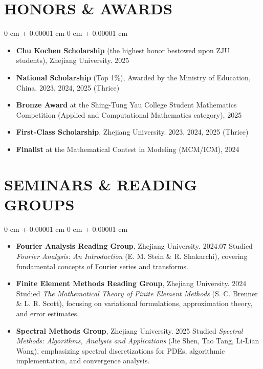 \documentclass[10pt, letterpaper]{article}
\newenvironment{highlights}{
    \begin{itemize}[
        topsep=0.10 cm,
        parsep=0.10 cm,
        partopsep=0pt,
        itemsep=0pt,
        leftmargin=0 cm + 10pt
    ]
}{
    \end{itemize}
} %
\newenvironment{onecolentry}{
    \begin{adjustwidth}{
        0 cm + 0.00001 cm
    }{
        0 cm + 0.00001 cm
    }
}{
    \end{adjustwidth}
} %
\begin{document}
    \section{HONORS \& AWARDS}
        \begin{onecolentry}
            \begin{highlights}
                \item \textbf{Chu Kochen Scholarship} (the highest honor bestowed upon ZJU students), Zhejiang University. 2025
                \item \textbf{National Scholarship} (Top 1\%), Awarded by the Ministry of Education, China. 2023, 2024, 2025 (Thrice)
                \item \textbf{Bronze Award} at the Shing-Tung Yau College Student Mathematics Competition (Applied and Computational Mathematics category), 2025
                \item \textbf{First-Class Scholarship}, Zhejiang University. 2023, 2024, 2025 (Thrice)
                \item \textbf{Finalist} at the Mathematical Contest in Modeling (MCM/ICM), 2024
            \end{highlights}
        \end{onecolentry}

    
    \section{SEMINARS \& READING GROUPS}
        \begin{onecolentry}
            \begin{highlights}
                \item \textbf{Fourier Analysis Reading Group}, Zhejiang University. 2024.07  
                Studied \textit{Fourier Analysis: An Introduction} (E. M. Stein \& R. Shakarchi), covering fundamental concepts of Fourier series and transforms.

                \item \textbf{Finite Element Methods Reading Group}, Zhejiang University. 2024  
                Studied \textit{The Mathematical Theory of Finite Element Methods} (S. C. Brenner \& L. R. Scott), focusing on variational formulations, approximation theory, and error estimates.

                \item \textbf{Spectral Methods Group}, Zhejiang University. 2025  
                Studied \textit{Spectral Methods: Algorithms, Analysis and Applications} (Jie Shen, Tao Tang, Li-Lian Wang), emphasizing spectral discretizations for PDEs, algorithmic implementation, and convergence analysis.
            \end{highlights}
        \end{onecolentry}
\end{document}
